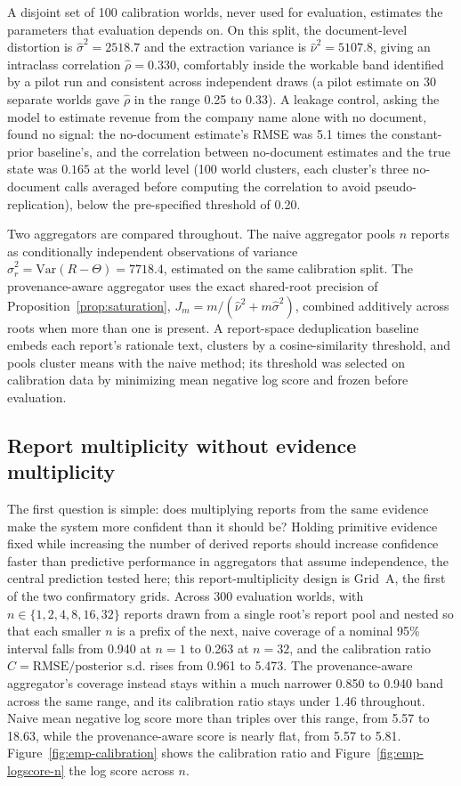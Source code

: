 A disjoint set of 100 calibration worlds, never used for evaluation,
estimates the parameters that evaluation depends on. On this split, the
document-level distortion is $\hat\sigma^2=2518.7$ and the extraction
variance is $\hat\nu^2=5107.8$, giving an intraclass correlation
$\hat\rho=0.330$, comfortably inside the workable band identified by a
pilot run and consistent across independent draws (a pilot estimate on 30
separate worlds gave $\hat\rho$ in the range 0.25 to 0.33). A leakage
control, asking the model to estimate revenue from the company name alone
with no document, found no signal: the no-document estimate's RMSE was 5.1
times the constant-prior baseline's, and the correlation between
no-document estimates and the true state was $0.165$ at the world level
(100 world clusters, each cluster's three no-document calls averaged
before computing the correlation to avoid pseudo-replication), below the
pre-specified threshold of 0.20.

Two aggregators are compared throughout. The naive aggregator pools $n$
reports as conditionally independent observations of variance
$\hat\sigma_r^2=\mathrm{Var}(R-\Theta)=7718.4$, estimated on the same
calibration split. The provenance-aware aggregator uses the exact
shared-root precision of Proposition~\ref{prop:saturation},
$J_m=m/(\hat\nu^2+m\hat\sigma^2)$, combined additively across roots when
more than one is present. A report-space deduplication baseline embeds
each report's rationale text, clusters by a cosine-similarity threshold,
and pools cluster means with the naive method; its threshold was selected
on calibration data by minimizing mean negative log score and frozen
before evaluation.

\subsection{Report multiplicity without evidence multiplicity}
\label{sec:emp-multiplicity}

The first question is simple: does multiplying reports from the same
evidence make the system more confident than it should be? Holding
primitive evidence fixed while increasing the number of derived
reports should increase confidence faster than predictive performance in
aggregators that assume independence, the central prediction tested here;
this report-multiplicity design is Grid~A, the first of the two
confirmatory grids. Across 300 evaluation worlds, with
$n\in\{1,2,4,8,16,32\}$ reports drawn from a single root's report pool and
nested so that each smaller $n$ is a prefix of the next, naive coverage of
a nominal 95\% interval falls from 0.940 at $n=1$ to 0.263 at $n=32$, and
the calibration ratio $C=\mathrm{RMSE}/\text{posterior s.d.}$ rises from
0.961 to 5.473. The provenance-aware aggregator's coverage instead stays
within a much narrower 0.850 to 0.940 band across the same range, and its
calibration ratio stays under 1.46 throughout. Naive mean negative log
score more than triples over this range, from 5.57 to 18.63, while the
provenance-aware score is nearly flat, from 5.57 to 5.81. Figure~\ref{fig:emp-calibration}
shows the calibration ratio and Figure~\ref{fig:emp-logscore-n} the log
score across $n$.


